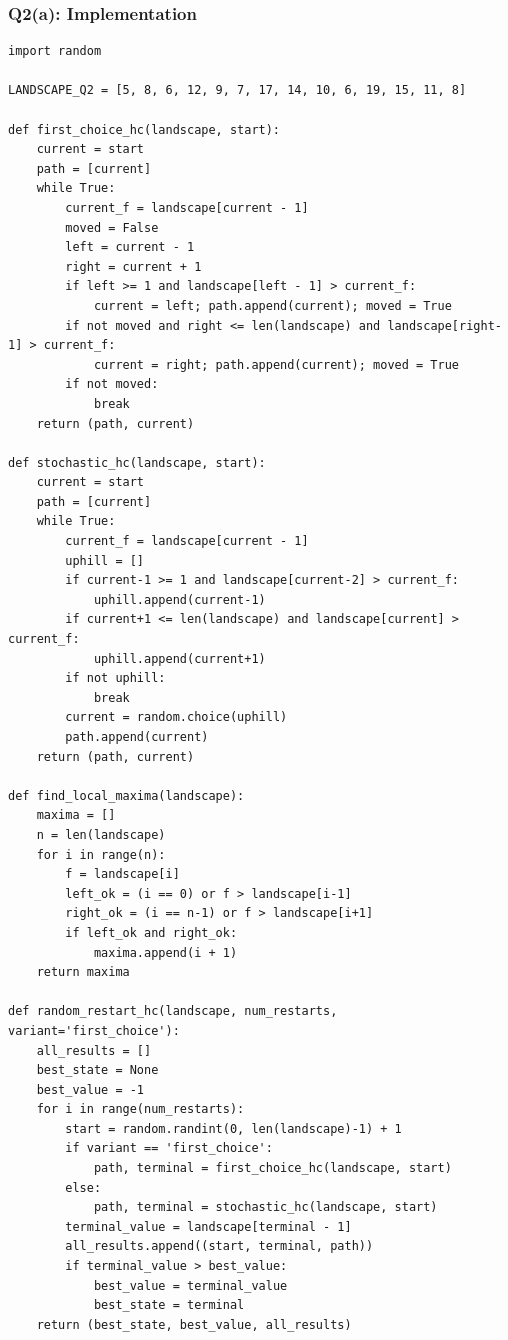 \documentclass[12pt,a4paper]{article}
\begin{document}
\subsubsection*{Q2(a): Implementation}

\begin{lstlisting}[style=pycode, caption={Q2: Random Restart HC}]
import random

LANDSCAPE_Q2 = [5, 8, 6, 12, 9, 7, 17, 14, 10, 6, 19, 15, 11, 8]

def first_choice_hc(landscape, start):
    current = start
    path = [current]
    while True:
        current_f = landscape[current - 1]
        moved = False
        left = current - 1
        right = current + 1
        if left >= 1 and landscape[left - 1] > current_f:
            current = left; path.append(current); moved = True
        if not moved and right <= len(landscape) and landscape[right-1] > current_f:
            current = right; path.append(current); moved = True
        if not moved:
            break
    return (path, current)

def stochastic_hc(landscape, start):
    current = start
    path = [current]
    while True:
        current_f = landscape[current - 1]
        uphill = []
        if current-1 >= 1 and landscape[current-2] > current_f:
            uphill.append(current-1)
        if current+1 <= len(landscape) and landscape[current] > current_f:
            uphill.append(current+1)
        if not uphill:
            break
        current = random.choice(uphill)
        path.append(current)
    return (path, current)

def find_local_maxima(landscape):
    maxima = []
    n = len(landscape)
    for i in range(n):
        f = landscape[i]
        left_ok = (i == 0) or f > landscape[i-1]
        right_ok = (i == n-1) or f > landscape[i+1]
        if left_ok and right_ok:
            maxima.append(i + 1)
    return maxima

def random_restart_hc(landscape, num_restarts, variant='first_choice'):
    all_results = []
    best_state = None
    best_value = -1
    for i in range(num_restarts):
        start = random.randint(0, len(landscape)-1) + 1
        if variant == 'first_choice':
            path, terminal = first_choice_hc(landscape, start)
        else:
            path, terminal = stochastic_hc(landscape, start)
        terminal_value = landscape[terminal - 1]
        all_results.append((start, terminal, path))
        if terminal_value > best_value:
            best_value = terminal_value
            best_state = terminal
    return (best_state, best_value, all_results)
\end{lstlisting}
\end{document}
